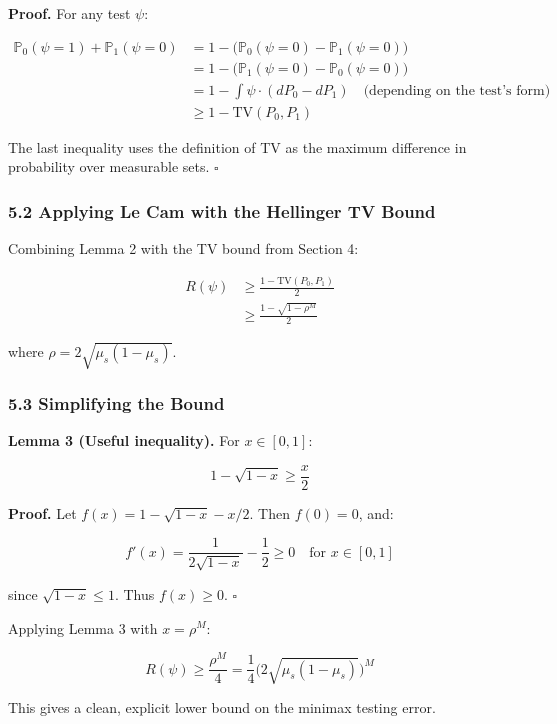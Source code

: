 \documentclass[
  12pt,
]{article}
\begin{document}
\textbf{Proof.} For any test \(\psi\):

\[\begin{aligned}
\mathbb{P}_0(\psi = 1) + \mathbb{P}_1(\psi = 0)
&= 1 - \bigl(\mathbb{P}_0(\psi = 0) - \mathbb{P}_1(\psi = 0)\bigr) \\
&= 1 - \bigl(\mathbb{P}_1(\psi = 0) - \mathbb{P}_0(\psi = 0)\bigr) \\
&= 1 - \int \psi \cdot (dP_0 - dP_1) \quad\text{(depending on the test's form)} \\
&\geq 1 - \text{TV}(P_0, P_1)
\end{aligned}\]

The last inequality uses the definition of TV as the maximum difference
in probability over measurable sets. \(\square\)

\subsubsection{5.2 Applying Le Cam with the Hellinger TV
Bound}\label{applying-le-cam-with-the-hellinger-tv-bound}

Combining Lemma 2 with the TV bound from Section 4:

\[\begin{aligned}
R(\psi) &\geq \frac{1 - \text{TV}(P_0, P_1)}{2} \\
&\geq \frac{1 - \sqrt{1 - \rho^M}}{2}
\end{aligned}\]

where \(\rho = 2\sqrt{\mu_s(1-\mu_s)}\).

\subsubsection{5.3 Simplifying the Bound}\label{simplifying-the-bound}

\textbf{Lemma 3 (Useful inequality).} For \(x \in [0, 1]\):

\[1 - \sqrt{1 - x} \geq \frac{x}{2}\]

\textbf{Proof.} Let \(f(x) = 1 - \sqrt{1-x} - x/2\). Then \(f(0) = 0\),
and:

\[f'(x) = \frac{1}{2\sqrt{1-x}} - \frac12 \geq 0 \quad \text{for } x \in [0,1]\]

since \(\sqrt{1-x} \leq 1\). Thus \(f(x) \geq 0\). \(\square\)

Applying Lemma 3 with \(x = \rho^M\):

\[R(\psi) \geq \frac{\rho^M}{4} = \frac14 \bigl(2\sqrt{\mu_s(1-\mu_s)}\bigr)^M\]

This gives a clean, explicit lower bound on the minimax testing error.
\end{document}
